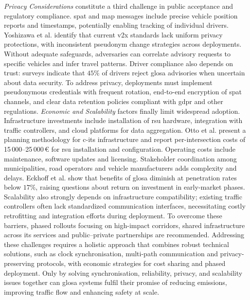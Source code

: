 \mynewline
\textit{Privacy Considerations} constitute a third challenge in public acceptance and regulatory compliance. \ac{spat} and \ac{map} messages include precise vehicle position reports and timestamps, potentially enabling tracking of individual drivers. Yoshizawa et al. \cite{Yoshizawa2022} identify that current \ac{v2x} standards lack uniform privacy protections, with inconsistent pseudonym change strategies across deployments. Without adequate safeguards, adversaries can correlate advisory requests to specific vehicles and infer travel patterns. Driver compliance also depends on trust: surveys indicate that $45\%$ of drivers reject \ac{glosa} advisories when uncertain about data security. \cite{Application2011} To address privacy, deployments must implement pseudonymous credentials with frequent rotation, end-to-end encryption of \ac{spat} channels, and clear data retention policies compliant with \ac{gdpr} and other regulations.
\mynewline
\textit{Economic and Scalability} factors finally limit widespread adoption. Infrastructure investments include installation of \ac{rsu} hardware, integration with traffic controllers, and cloud platforms for data aggregation. Otto et al. \cite{Otto2023} present a planning methodology for \ac{c-its} infrastructure and report per-intersection costs of 15\,000--25\,000\,\euro{} for \ac{rsu} installation and configuration. Operating costs include maintenance, software updates and licensing. Stakeholder coordination among municipalities, road operators and vehicle manufacturers adds complexity and delays. Eckhoff et al. \cite{Eckhoff2013} show that benefits of \ac{glosa} diminish at penetration rates below $17\%$, raising questions about return on investment in early-market phases. Scalability also strongly depends on infrastructure compatibility; existing traffic controllers often lack standardized communication interfaces, necessitating costly retrofitting and integration efforts during deployment. To overcome these barriers, phased rollouts focusing on high-impact corridors, shared infrastructure across \ac{its} services and public–private partnerships are recommended.
\mynewline
Addressing these challenges requires a holistic approach that combines robust technical solutions, such as clock synchronisation, multi-path communication and privacy-preserving protocols, with economic strategies for cost sharing and phased deployment. Only by solving synchronisation, reliability, privacy, and scalability issues together can \ac{glosa} systems fulfil their promise of reducing emissions, improving traffic flow and enhancing safety at scale.


